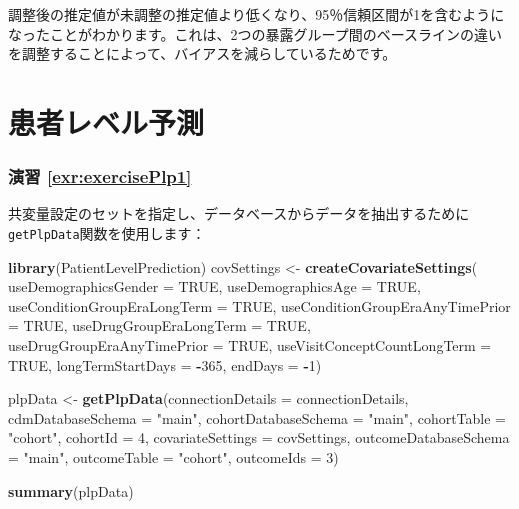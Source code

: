 \documentclass[
  11pt]{book}
\newenvironment{Shaded}{\begin{snugshade}}{\end{snugshade}}
\newcommand{\AttributeTok}[1]{\textcolor[rgb]{0.13,0.29,0.53}{#1}}
\newcommand{\ConstantTok}[1]{\textcolor[rgb]{0.56,0.35,0.01}{#1}}
\newcommand{\DecValTok}[1]{\textcolor[rgb]{0.00,0.00,0.81}{#1}}
\newcommand{\FunctionTok}[1]{\textcolor[rgb]{0.13,0.29,0.53}{\textbf{#1}}}
\newcommand{\NormalTok}[1]{#1}
\newcommand{\OtherTok}[1]{\textcolor[rgb]{0.56,0.35,0.01}{#1}}
\newcommand{\SpecialCharTok}[1]{\textcolor[rgb]{0.81,0.36,0.00}{\textbf{#1}}}
\newcommand{\StringTok}[1]{\textcolor[rgb]{0.31,0.60,0.02}{#1}}
\theoremstyle{definition}
\theoremstyle{definition}
\theoremstyle{definition}
\theoremstyle{definition}
\theoremstyle{remark}
\begin{document}
調整後の推定値が未調整の推定値より低くなり、95％信頼区間が1を含むようになったことがわかります。これは、2つの暴露グループ間のベースラインの違いを調整することによって、バイアスを減らしているためです。

\section{患者レベル予測}\label{Plpanswers}

\subsubsection*{演習 \ref{exr:exercisePlp1}}\label{ux6f14ux7fd2-refexrexerciseplp1}

共変量設定のセットを指定し、データベースからデータを抽出するために\texttt{getPlpData}関数を使用します：

\begin{Shaded}
\begin{Highlighting}[]
\FunctionTok{library}\NormalTok{(PatientLevelPrediction)}
\NormalTok{covSettings }\OtherTok{\textless{}{-}} \FunctionTok{createCovariateSettings}\NormalTok{(}
  \AttributeTok{useDemographicsGender =} \ConstantTok{TRUE}\NormalTok{,}
  \AttributeTok{useDemographicsAge =} \ConstantTok{TRUE}\NormalTok{,}
  \AttributeTok{useConditionGroupEraLongTerm =} \ConstantTok{TRUE}\NormalTok{,}
  \AttributeTok{useConditionGroupEraAnyTimePrior =} \ConstantTok{TRUE}\NormalTok{,}
  \AttributeTok{useDrugGroupEraLongTerm =} \ConstantTok{TRUE}\NormalTok{,}
  \AttributeTok{useDrugGroupEraAnyTimePrior =} \ConstantTok{TRUE}\NormalTok{,}
  \AttributeTok{useVisitConceptCountLongTerm =} \ConstantTok{TRUE}\NormalTok{,}
  \AttributeTok{longTermStartDays =} \SpecialCharTok{{-}}\DecValTok{365}\NormalTok{,}
  \AttributeTok{endDays =} \SpecialCharTok{{-}}\DecValTok{1}\NormalTok{)}

\NormalTok{plpData }\OtherTok{\textless{}{-}} \FunctionTok{getPlpData}\NormalTok{(}\AttributeTok{connectionDetails =}\NormalTok{ connectionDetails,}
                      \AttributeTok{cdmDatabaseSchema =} \StringTok{"main"}\NormalTok{,}
                      \AttributeTok{cohortDatabaseSchema =} \StringTok{"main"}\NormalTok{,}
                      \AttributeTok{cohortTable =} \StringTok{"cohort"}\NormalTok{,}
                      \AttributeTok{cohortId =} \DecValTok{4}\NormalTok{,}
                      \AttributeTok{covariateSettings =}\NormalTok{ covSettings,}
                      \AttributeTok{outcomeDatabaseSchema =} \StringTok{"main"}\NormalTok{,}
                      \AttributeTok{outcomeTable =} \StringTok{"cohort"}\NormalTok{,}
                      \AttributeTok{outcomeIds =} \DecValTok{3}\NormalTok{)}

\FunctionTok{summary}\NormalTok{(plpData)}
\end{Highlighting}
\end{Shaded}
\end{document}
